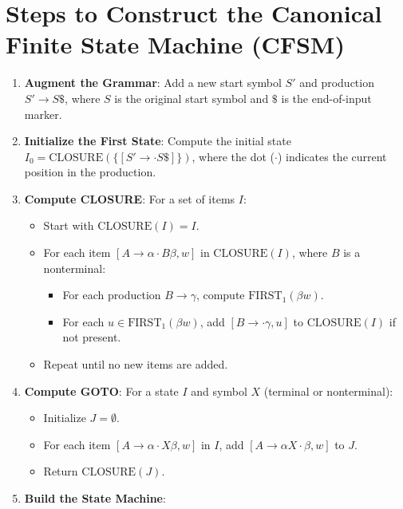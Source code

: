 \section*{Steps to Construct the Canonical Finite State Machine (CFSM)}
\begin{enumerate}
    \item \textbf{Augment the Grammar}: Add a new start symbol \( S' \) and production \( S' \to S \$ \), where \( S \) is the original start symbol and \( \$ \) is the end-of-input marker.
    \item \textbf{Initialize the First State}: Compute the initial state \( I_0 = \text{CLOSURE}(\{[S' \to \cdot S \$]\}) \), where the dot (\(\cdot\)) indicates the current position in the production.
    \item \textbf{Compute CLOSURE}: For a set of items \( I \):
        \begin{itemize}
            \item Start with \( \text{CLOSURE}(I) = I \).
            \item For each item \( [A \to \alpha \cdot B \beta, w] \) in \( \text{CLOSURE}(I) \), where \( B \) is a nonterminal:
                \begin{itemize}
                    \item For each production \( B \to \gamma \), compute \( \text{FIRST}_1(\beta w) \).
                    \item For each \( u \in \text{FIRST}_1(\beta w) \), add \( [B \to \cdot \gamma, u] \) to \( \text{CLOSURE}(I) \) if not present.
                \end{itemize}
            \item Repeat until no new items are added.
        \end{itemize}
    \item \textbf{Compute GOTO}: For a state \( I \) and symbol \( X \) (terminal or nonterminal):
        \begin{itemize}
            \item Initialize \( J = \emptyset \).
            \item For each item \( [A \to \alpha \cdot X \beta, w] \) in \( I \), add \( [A \to \alpha X \cdot \beta, w] \) to \( J \).
            \item Return \( \text{CLOSURE}(J) \).
        \end{itemize}
    \item \textbf{Build the State Machine}:
        \begin{itemize}

\end{itemize}
\end{enumerate}

